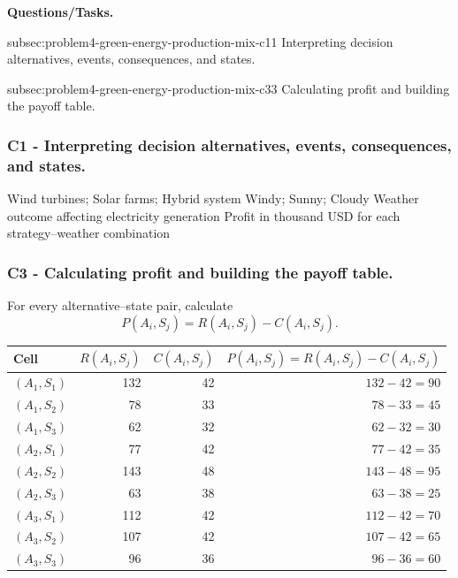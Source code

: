 \textbf{Questions/Tasks.}
\begin{enumerate}
	\CriterionTask
	{subsec:problem4-green-energy-production-mix-c1}{1}
	{Interpreting decision alternatives, events, consequences, and states.}

	\CriterionTask
	{subsec:problem4-green-energy-production-mix-c3}{3}
	{Calculating profit and building the payoff table.}
\end{enumerate}

\subsubsection*{C1 - Interpreting decision alternatives, events, consequences, and states.}
\label{subsec:problem4-green-energy-production-mix-c1}

\DecisionElementsTable
{Wind turbines; Solar farms; Hybrid system}
{Windy; Sunny; Cloudy}
{Weather outcome affecting electricity generation}
{Profit in thousand USD for each strategy--weather combination}


\subsubsection*{C3 - Calculating profit and building the payoff table.}
\label{subsec:problem4-green-energy-production-mix-c3}

For every alternative--state pair, calculate
\[
P(A_i,S_j)=R(A_i,S_j)-C(A_i,S_j).
\]

\begin{center}
	\small
	\begin{tabular}{lrrr}
		\toprule
		Cell
		& \(R(A_i,S_j)\)
		& \(C(A_i,S_j)\)
		& \(P(A_i,S_j)=R(A_i,S_j)-C(A_i,S_j)\) \\
		\midrule
		\((A_1,S_1)\) & 132 & 42 & \(132-42=90\) \\
		\((A_1,S_2)\) & 78  & 33 & \(78-33=45\) \\
		\((A_1,S_3)\) & 62  & 32 & \(62-32=30\) \\
		\((A_2,S_1)\) & 77  & 42 & \(77-42=35\) \\
		\((A_2,S_2)\) & 143 & 48 & \(143-48=95\) \\
		\((A_2,S_3)\) & 63  & 38 & \(63-38=25\) \\
		\((A_3,S_1)\) & 112 & 42 & \(112-42=70\) \\
		\((A_3,S_2)\) & 107 & 42 & \(107-42=65\) \\
		\((A_3,S_3)\) & 96  & 36 & \(96-36=60\) \\
		\bottomrule
	\end{tabular}
\end{center}

